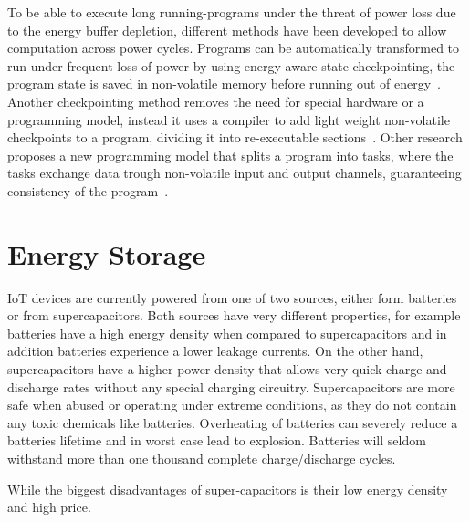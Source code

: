 To be able to execute long running-programs under the threat of power loss due to the energy buffer depletion, different methods have been developed to allow computation across power cycles.
Programs can be automatically transformed to run under frequent loss of power by using energy-aware state checkpointing, the program state is saved in non-volatile memory before running out of energy~\cite{ransford_asplos_2011}.
Another checkpointing method removes the need for special hardware or a programming model, instead it uses a compiler to add light weight non-volatile checkpoints to a program, dividing it into re-executable sections~\cite{vanderwoude_osdi_2016}.
Other research proposes a new programming model that splits a program into tasks, where the tasks exchange data trough non-volatile input and output channels, guaranteeing consistency of the program~\cite{Colin_oopsla_2017}.


\section{Energy Storage}
\label{sec:energy_storage}



IoT devices are currently powered from one of two sources, either form batteries or from supercapacitors. 
Both sources have very different properties, for example batteries have a high energy density when compared to supercapacitors and in addition batteries experience a lower leakage currents.
On the other hand, supercapacitors have a higher power density that allows very quick charge and discharge rates without any special charging circuitry.
Supercapacitors are more safe when abused or operating under extreme conditions, as they do not contain any toxic chemicals like batteries.
Overheating of batteries can severely reduce a batteries lifetime and in worst case lead to explosion.
Batteries will seldom withstand more than one thousand complete charge/discharge cycles.

While the biggest disadvantages of super-capacitors is their low energy density and high price.




